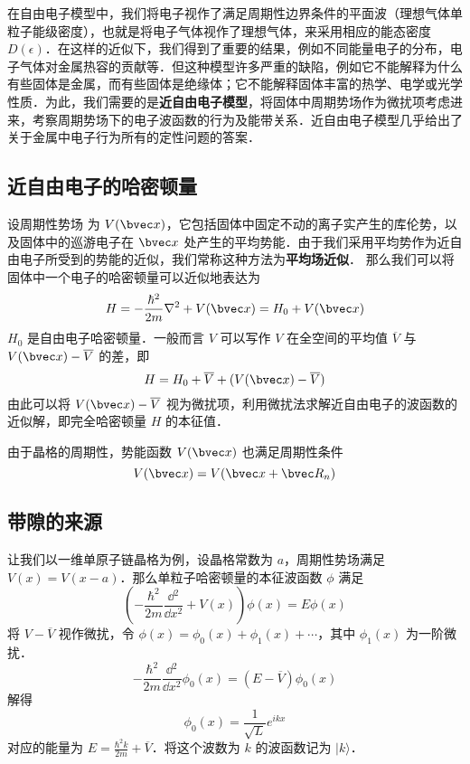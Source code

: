 

在自由电子模型中，我们将电子视作了满足周期性边界条件的平面波（理想气体单粒子能级密度），也就是将电子气体视作了理想气体，来采用相应的能态密度 $D(\epsilon)$．在这样的近似下，我们得到了重要的结果，例如不同能量电子的分布，电子气体对金属热容的贡献等．但这种模型许多严重的缺陷，例如它不能解释为什么有些固体是金属，而有些固体是绝缘体；它不能解释固体丰富的热学、电学或光学性质．为此，我们需要的是\textbf{近自由电子模型}，将固体中周期势场作为微扰项考虑进来，考察周期势场下的电子波函数的行为及能带关系．近自由电子模型几乎给出了关于金属中电子行为所有的定性问题的答案．
\subsection{近自由电子的哈密顿量}
设周期性势场 为 $V(\bvec x)$，它包括固体中固定不动的离子实产生的库伦势，以及固体中的巡游电子在 $\bvec x$ 处产生的平均势能．由于我们采用平均势作为近自由电子所受到的势能的近似，我们常称这种方法为\textbf{平均场近似}．
那么我们可以将固体中一个电子的哈密顿量可以近似地表达为
\begin{equation}
H=-\frac{\hbar^2}{2m}\nabla^2+V(\bvec x)=H_0+V(\bvec x)
\end{equation}
$H_0$ 是自由电子哈密顿量．一般而言 $V$ 可以写作 $V$ 在全空间的平均值 $\overline V$ 与 $V(\bvec x)-\overline V$ 的差，即
\begin{equation}
H=H_0+\overline V+(V(\bvec x)-\overline V)
\end{equation}
由此可以将 $V(\bvec x)-\overline V$ 视为微扰项，利用微扰法求解近自由电子的波函数的近似解，即完全哈密顿量 $H$ 的本征值．

由于晶格的周期性，势能函数 $V(\bvec x)$ 也满足周期性条件
\begin{equation}
V(\bvec x)=V(\bvec x+\bvec R_n)
\end{equation}
\subsection{带隙的来源}
让我们以一维单原子链晶格为例，设晶格常数为 $a$，周期性势场满足 $V(x)=V(x-a)$．那么单粒子哈密顿量的本征波函数 $\phi$ 满足
\begin{equation}\label{egasmd_eq1}
\left(-\frac{\hbar^2}{2m}\frac{\dd{}^2}{\dd x^2}+V(x)\right)\phi(x)=E\phi(x)
\end{equation}
将 $V-\overline V$ 视作微扰，令 $\phi(x)=\phi_0(x)+\phi_1(x)+\cdots$，其中 $\phi_1(x)$ 为一阶微扰．
\begin{equation}
-\frac{\hbar^2}{2m}\frac{\dd{}^2}{\dd x^2} \phi_0(x)=(E-\overline V)\phi_0(x)
\end{equation}
解得
\begin{equation}
\phi_0(x)=\frac{1}{\sqrt{L}}e^{ikx}
\end{equation}
对应的能量为 $E=\frac{\hbar^2 k}{2m}+\overline V$．将这个波数为 $k$ 的波函数记为 $|k\rangle$．

